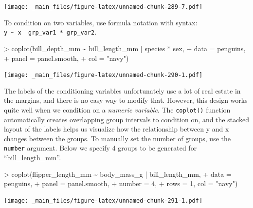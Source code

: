 \documentclass[
]{book}
\newenvironment{Shaded}{\begin{snugshade}}{\end{snugshade}}
\newcommand{\AttributeTok}[1]{\textcolor[rgb]{0.77,0.63,0.00}{#1}}
\newcommand{\DecValTok}[1]{\textcolor[rgb]{0.00,0.00,0.81}{#1}}
\newcommand{\FunctionTok}[1]{\textcolor[rgb]{0.00,0.00,0.00}{#1}}
\newcommand{\NormalTok}[1]{#1}
\newcommand{\SpecialCharTok}[1]{\textcolor[rgb]{0.00,0.00,0.00}{#1}}
\newcommand{\StringTok}[1]{\textcolor[rgb]{0.31,0.60,0.02}{#1}}
\begin{document}
\texttt{[image: \_main\_files/figure-latex/unnamed-chunk-289-7.pdf]}

To condition on two variables, use formula notation with syntax: \texttt{y\ \textasciitilde{}\ x\ \textbar{}\ grp\_var1\ *\ grp\_var2}.

\begin{Shaded}
\begin{Highlighting}[]
\SpecialCharTok{\textgreater{}} \FunctionTok{coplot}\NormalTok{(bill\_depth\_mm }\SpecialCharTok{\textasciitilde{}}\NormalTok{ bill\_length\_mm }\SpecialCharTok{|}\NormalTok{ species }\SpecialCharTok{*}\NormalTok{ sex, }
\SpecialCharTok{+}        \AttributeTok{data =}\NormalTok{ penguins,}
\SpecialCharTok{+}        \AttributeTok{panel =}\NormalTok{ panel.smooth,}
\SpecialCharTok{+}        \AttributeTok{col =} \StringTok{"navy"}\NormalTok{)}
\end{Highlighting}
\end{Shaded}

\texttt{[image: \_main\_files/figure-latex/unnamed-chunk-290-1.pdf]}

The labels of the conditioning variables unfortunately use a lot of real estate in the margins, and there is no easy way to modify that. However, this design works quite well when we condition on a \emph{numeric variable}. The \texttt{coplot()} function automatically creates overlapping group intervals to condition on, and the stacked layout of the labels helps us visualize how the relationship between y and x changes between the groups. To manually set the number of groups, use the \texttt{number} argument. Below we specify 4 groups to be generated for ``bill\_length\_mm''.

\begin{Shaded}
\begin{Highlighting}[]
\SpecialCharTok{\textgreater{}} \FunctionTok{coplot}\NormalTok{(flipper\_length\_mm }\SpecialCharTok{\textasciitilde{}}\NormalTok{ body\_mass\_g }\SpecialCharTok{|}\NormalTok{ bill\_length\_mm, }
\SpecialCharTok{+}        \AttributeTok{data =}\NormalTok{ penguins,}
\SpecialCharTok{+}        \AttributeTok{panel =}\NormalTok{ panel.smooth,}
\SpecialCharTok{+}        \AttributeTok{number =} \DecValTok{4}\NormalTok{, }
\SpecialCharTok{+}        \AttributeTok{rows =} \DecValTok{1}\NormalTok{, }\AttributeTok{col =} \StringTok{"navy"}\NormalTok{)}
\end{Highlighting}
\end{Shaded}

\texttt{[image: \_main\_files/figure-latex/unnamed-chunk-291-1.pdf]}
\end{document}
